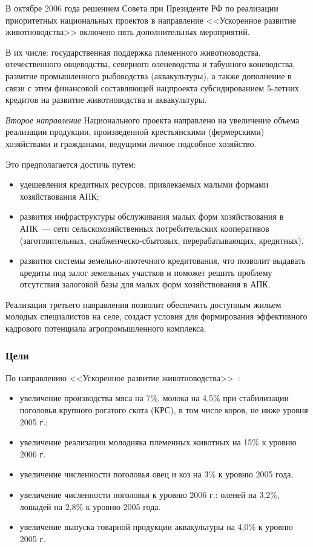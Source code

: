 \documentclass[article, 12pt, russian, oneside]{ncc}
\begin{document}
В октябре 2006 года решением Совета при Президенте РФ по реализации
приоритетных национальных проектов в направление <<Ускоренное развитие
животноводства>> включено пять дополнительных мероприятий.

В их числе: государственная поддержка племенного животноводства,
отечественного овцеводства, северного оленеводства и табунного
коневодства, развитие промышленного рыбоводства (аквакультуры), а
также дополнение в связи с этим финансовой составляющей нацпроекта
субсидированием 5-летних кредитов на развитие животноводства и
аквакультуры.

\emph{Второе направление} Национального проекта направлено на
увеличение объема реализации продукции, произведенной крестьянскими
(фермерскими) хозяйствами и гражданами, ведущими личное подсобное
хозяйство.

Это предполагается достичь путем:

\begin{itemize}
\item удешевления кредитных ресурсов, привлекаемых малыми формами
  хозяйствования АПК;
\item развития инфраструктуры обслуживания малых форм хозяйствования в
  АПК~--- сети сельскохозяйственных потребительских кооперативов
  (заготовительных, снабженческо-сбытовых, перерабатывающих,
  кредитных).
\item развития системы земельно-ипотечного кредитования, что позволит
  выдавать кредиты под залог земельных участков и поможет решить
  проблему отсутствия залоговой базы для малых форм хозяйствования в
  АПК.
\end{itemize}

Реализация третьего направления позволит обеспечить доступным жильем
молодых специалистов на селе, создаст условия для формирования
эффективного кадрового потенциала агропромышленного комплекса.

\subsubsection{Цели}

По направлению <<Ускоренное развитие
животноводства>>~\cite{APK_Goals}:

\begin{itemize}
\item увеличение производства мяса на 7\%, молока на 4,5\% при
  стабилизации поголовья крупного рогатого скота (КРС), в том числе
  коров, не ниже уровня 2005 г.;
\item увеличение реализации молодняка племенных животных на 15\% к
  уровню 2006 г.
\item увеличение численности поголовья овец и коз на 3\% к уровню 2005
  года.
\item увеличение численности поголовья к уровню 2006 г.: оленей на
  3,2\%, лошадей на 2,8\% к уровню 2005 года.
\item увеличение выпуска товарной продукции аквакультуры на 4,0\% к
  уровню 2005 г.
\end{itemize}
\end{document}
